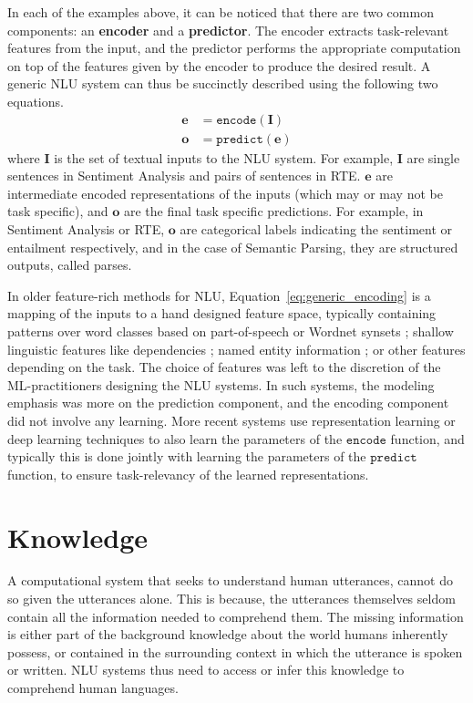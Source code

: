 In each of the examples above, it can be noticed that there are two common components: an \textbf{encoder} and a \textbf{predictor}. The encoder
extracts task-relevant features from the input, and the predictor performs the appropriate computation on top of the features given by the encoder
to produce the desired result. A generic NLU system can thus be succinctly described using the
following two equations.
\begin{align}
 \mathbf{e} &= \mathtt{encode}(\mathbf{I}) \label{eq:generic_encoding}\\
 \mathbf{o} &= \mathtt{predict}(\mathbf{e}) \label{eq:generic_prediction}
\end{align}
where $\mathbf{I}$ is the set of textual inputs to the NLU system. 
For example, $\mathbf{I}$  are single sentences in Sentiment Analysis and pairs of sentences in RTE. $\textbf{e}$ are intermediate 
encoded representations of the inputs (which may or may not be task specific), and $\mathbf{o}$ are the final task specific predictions. For example, in Sentiment Analysis or RTE, 
$\mathbf{o}$ are categorical labels indicating the sentiment or entailment respectively, and in the case of Semantic Parsing, they are structured outputs, called parses.

In older feature-rich methods for NLU, 
Equation~\ref{eq:generic_encoding} is a mapping of the inputs to a hand designed feature space, typically containing patterns over word classes based on
part-of-speech \citep{corley2005measuring} or Wordnet synsets \citep{moldovan2001logic}; shallow linguistic features like dependencies \citep{bos2005recognising};
named entity information \cite{tatu2005semantic}; or other features depending on the task. The choice of features was left to the discretion of the ML-practitioners
designing the NLU systems. In such systems, the modeling emphasis was more on the prediction component, and the encoding component did not involve any learning. 
More recent systems \citep[among many others]{bahdanau:14,weston2014memory,hermann2015teaching,Xiong2016DynamicMN,bowman2016fast,yang:16} 
use representation learning or deep learning techniques to also learn the parameters of the
$\mathtt{encode}$ function, and typically this is done jointly with learning the parameters of the $\mathtt{predict}$ function, to ensure task-relevancy of the learned representations.

\section{Knowledge}
\label{sec:intro_external_knowledge}
A computational system that seeks to understand human utterances, cannot do so given the utterances alone. This is because, the utterances themselves
seldom contain all the information needed to comprehend them. The missing information is either part of the background knowledge about the world humans
inherently possess, or contained in the surrounding context in which the utterance is spoken or written. NLU systems thus need to access or infer this knowledge
to comprehend human languages.

